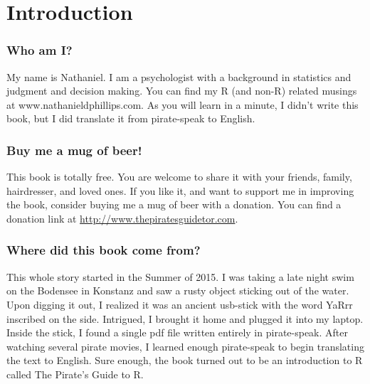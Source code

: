 \documentclass{tufte-book}\usepackage[]{graphicx}\usepackage[]{color}
\begin{document}


\chapter{Introduction}

\subsection{Who am I?}

My name is Nathaniel. I am a psychologist with a background in statistics and judgment and decision making. You can find my R (and non-R) related musings at www.nathanieldphillips.com. As you will learn in a minute, I didn't write this book, but I did translate it from pirate-speak to English.

\subsection{Buy me a mug of beer!}

This book is totally free. You are welcome to share it with your friends, family, hairdresser, and loved ones. If you like it, and want to support me in improving the book, consider buying me a mug of beer with a donation. You can find a donation link at \textcolor{blue}{\href{<http://www.thepiratesguidetor.com>}{http://www.thepiratesguidetor.com}}. 

\subsection{Where did this book come from?}

This whole story started in the Summer of 2015. I was taking a late night swim on the Bodensee in Konstanz and saw a rusty object sticking out of the water. Upon digging it out, I realized it was an ancient usb-stick with the word YaRrr inscribed on the side. Intrigued, I brought it home and plugged it into my laptop. Inside the stick, I found a single pdf file written entirely in pirate-speak. After watching several pirate movies, I learned enough pirate-speak to begin translating the text to English. Sure enough, the book turned out to be an introduction to R called The Pirate's Guide to R.
\end{document}
